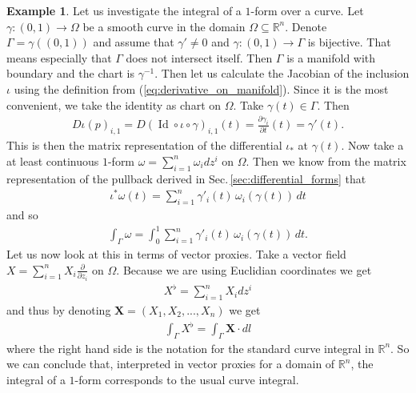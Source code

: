 \documentclass[12pt,a4paper]{article}
\numberwithin{equation}{subsection}
\numberwithin{lemma}{subsection}
\theoremstyle{definition}
\newtheorem{example}[lemma]{Example}
\DeclareMathOperator{\Id}{Id}
\newcommand{\real}{\mathbb{R}}
\begin{document}
\begin{example}
    Let us investigate the integral of a $1$-form over a curve. 
    Let $\gamma: (0,1) \rightarrow \Omega$ be a smooth curve in the domain $\Omega 
    \subseteq \real^n$. Denote $\Gamma = \gamma((0,1))$ and assume that 
    $\gamma' \neq 0$ and $\gamma: (0,1) \rightarrow \Gamma$ is bijective.
    That means especially that $\Gamma$ does not intersect itself.
    Then $\Gamma$ is a manifold with boundary and the chart is $\gamma^{-1}$.
    Then let us calculate the Jacobian of the inclusion $\iota$ using the 
    definition from (\ref{eq:derivative_on_manifold}). 
    Since it is the most convenient, we take the 
    identity as chart on $\Omega$. Take $\gamma(t) \in \Gamma$. Then
    \begin{align*}
        D\iota(p)_{i,1} = D(\Id \circ \iota \circ \gamma)_{i,1}(t)
        = \frac{\partial \gamma_i}{\partial t}(t)
        = \gamma'(t).
    \end{align*} 
    This is then the matrix representation of the differential $\iota_*$ at 
    $\gamma(t)$.
    Now take a at least continuous $1$-form $\omega = \sum_{i=1}^n \omega_i dz^i$ 
    on $\Omega$. Then we know from the matrix representation of the 
    pullback derived in Sec.\,\ref{sec:differential_forms} that 
    \begin{align*}
        \iota^*\omega (t) = \sum_{i=1}^n \gamma'_i(t) \, \omega_i(\gamma(t)) \,dt
    \end{align*}
    and so
    \begin{align*}
        \int_\Gamma \omega = \int_0^1\sum_{i=1}^n \gamma'_i(t) \, \omega_i(\gamma(t)) \,dt.
    \end{align*}
    Let us now look at this in terms of vector proxies. Take a vector field 
    $X = \sum_{i=1}^n X_i \frac{\partial}{\partial z_i}$ on $\Omega$.
    Because we are using Euclidian coordinates we get
    \begin{align*}
        X^\flat = \sum_{i=1}^n X_i dz^i
    \end{align*}
    and thus by denoting $\mathbf{X} = (X_1, X_2, ..., X_n)$ we get
    \begin{align*}
        \int_\Gamma X^\flat = \int_\Gamma \mathbf{X}\cdot dl
    \end{align*}
    where the right hand side is the notation for the standard curve integral 
    in $\real^n$. So we can conclude that, interpreted in vector proxies for 
    a domain of $\real^n$, the integral of a $1$-form corresponds to the usual 
    curve integral.
\end{example}
\end{document}
